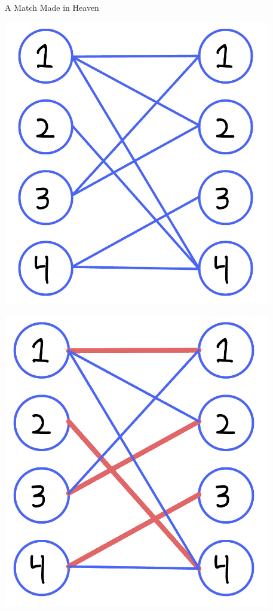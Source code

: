 \documentclass[aspectratio=169]{beamer}
\begin{document}
\begin{frame}{A Match Made in Heaven}
    \begin{minipage}[t]{0.49\textwidth}
        \includegraphics[width=0.875\textwidth]{G.png}
    \end{minipage}\pause
    \begin{minipage}[t]{0.49\textwidth}
        \includegraphics[width=0.875\textwidth]{M.png}
    \end{minipage}
\end{frame}
\end{document}
